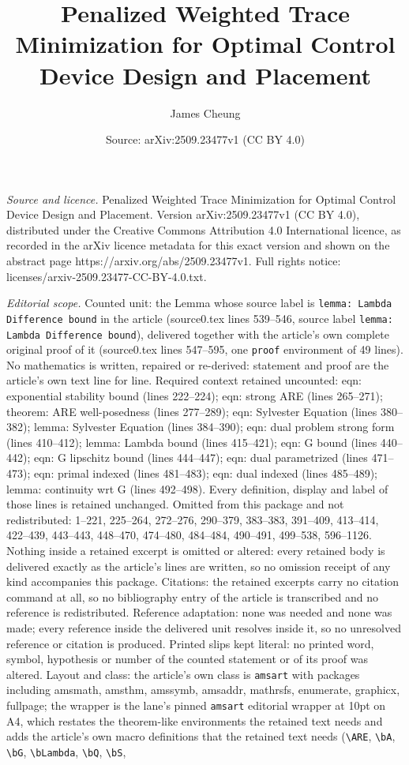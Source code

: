 \documentclass[10pt,a4paper]{amsart}
\title[Penalized Weighted Trace Minimization for Optimal Control De]{Penalized Weighted Trace Minimization for Optimal Control Device Design and Placement}
\author{James Cheung}
\date{Source: arXiv:2509.23477v1 (CC BY 4.0)}
\begin{document}
\maketitle

\noindent\emph{Source and licence.} Penalized Weighted Trace Minimization for Optimal Control Device Design and Placement. Version arXiv:2509.23477v1 (CC BY 4.0), distributed under the Creative Commons Attribution 4.0 International licence, as recorded in the arXiv licence metadata for this exact version and shown on the abstract page https://arxiv.org/abs/2509.23477v1. Full rights notice: licenses/arxiv-2509.23477-CC-BY-4.0.txt.\par\smallskip

\noindent\textit{Editorial scope.} Counted unit: the Lemma whose source label is \texttt{lemma: Lambda Difference bound} in the article (source0.tex lines 539--546, source label \texttt{lemma: Lambda Difference bound}), delivered together with the article's own complete original proof of it (source0.tex lines 547--595, one \texttt{proof} environment of 49 lines). No mathematics is written, repaired or re-derived: statement and proof are the article's own text line for line. Required context retained uncounted: eqn: exponential stability bound (lines 222--224); eqn: strong ARE (lines 265--271); theorem: ARE well-posedness (lines 277--289); eqn: Sylvester Equation (lines 380--382); lemma: Sylvester Equation (lines 384--390); eqn: dual problem strong form (lines 410--412); lemma: Lambda bound (lines 415--421); eqn: G bound (lines 440--442); eqn: G lipschitz bound (lines 444--447); eqn: dual parametrized (lines 471--473); eqn: primal indexed (lines 481--483); eqn: dual indexed (lines 485--489); lemma: continuity wrt G (lines 492--498). Every definition, display and label of those lines is retained unchanged. Omitted from this package and not redistributed: 1--221, 225--264, 272--276, 290--379, 383--383, 391--409, 413--414, 422--439, 443--443, 448--470, 474--480, 484--484, 490--491, 499--538, 596--1126. Nothing inside a retained excerpt is omitted or altered: every retained body is delivered exactly as the article's lines are written, so no omission receipt of any kind accompanies this package. Citations: the retained excerpts carry no citation command at all, so no bibliography entry of the article is transcribed and no reference is redistributed. Reference adaptation: none was needed and none was made; every reference inside the delivered unit resolves inside it, so no unresolved reference or citation is produced. Printed slips kept literal: no printed word, symbol, hypothesis or number of the counted statement or of its proof was altered. Layout and class: the article's own class is \texttt{amsart} with packages including amsmath, amsthm, amssymb, amsaddr, mathrsfs, enumerate, graphicx, fullpage; the wrapper is the lane's pinned \texttt{amsart} editorial wrapper at 10pt on A4, which restates the theorem-like environments the retained text needs and adds the article's own macro definitions that the retained text needs (\texttt{\textbackslash ARE}, \texttt{\textbackslash bA}, \texttt{\textbackslash bG}, \texttt{\textbackslash bLambda}, \texttt{\textbackslash bQ}, \texttt{\textbackslash bS}, 
\end{document}
